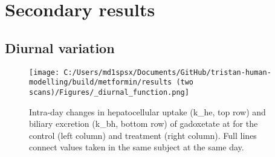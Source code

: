 \documentclass{epflreport}%
\begin{document}
\chapter{Secondary results}%
\section{Diurnal variation}%
\label{sec:Diurnalvariation}%

%


\begin{figure}[h!]%
\centering%
\texttt{[image: C:/Users/md1spsx/Documents/GitHub/tristan-human-modelling/build/metformin/results (two scans)/Figures/\_diurnal\_function.png]}%
\caption{Intra{-}day changes in hepatocellular uptake (k\_he, top row) and biliary excretion (k\_bh, bottom row) of gadoxetate at for the control (left column) and treatment (right column). Full lines connect values taken in the same subject at the same day.}%
\end{figure}

%
\end{document}
